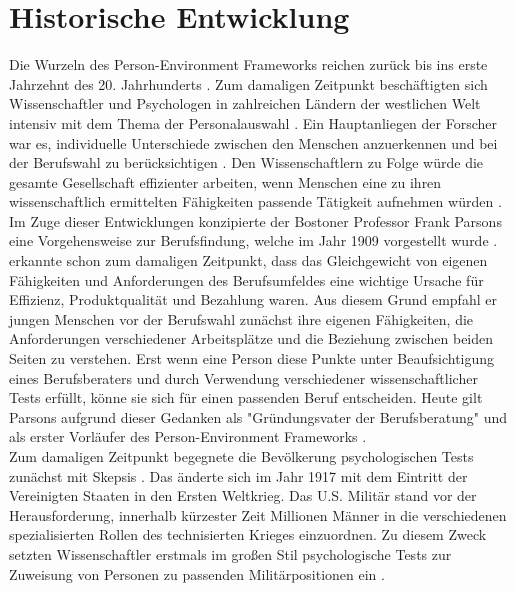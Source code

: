 \section{Historische Entwicklung}
\label{ch:personEnvironmentFit:historisches}
Die Wurzeln des Person-Environment Frameworks reichen zurück bis ins erste Jahrzehnt des 20. Jahrhunderts \cite[S. 1]{su:2015}. Zum damaligen Zeitpunkt beschäftigten sich Wissenschaftler und Psychologen in zahlreichen Ländern der westlichen Welt intensiv mit dem Thema der Personalauswahl \cite[S. 1]{salgado:2001}. Ein Hauptanliegen der Forscher war es, individuelle Unterschiede zwischen den Menschen anzuerkennen und bei der Berufswahl zu berücksichtigen \cite[S. 2ff.]{stern:1900}. Den Wissenschaftlern zu Folge würde die gesamte Gesellschaft effizienter arbeiten, wenn Menschen eine zu ihren wissenschaftlich ermittelten Fähigkeiten passende Tätigkeit aufnehmen würden \cite[S.2]{kevles:1968}\cite[S. 3]{parsons:1909}. Im Zuge dieser Entwicklungen konzipierte der Bostoner Professor Frank Parsons eine Vorgehensweise zur Berufsfindung, welche im Jahr 1909 vorgestellt wurde \cite[S. 1]{su:2015}. \textcite[S. 5ff.]{parsons:1909} erkannte schon zum damaligen Zeitpunkt, dass das Gleichgewicht von eigenen Fähigkeiten und Anforderungen des Berufsumfeldes eine wichtige Ursache für Effizienz, Produktqualität und Bezahlung waren. Aus diesem Grund empfahl er jungen Menschen vor der Berufswahl zunächst ihre eigenen Fähigkeiten, die Anforderungen verschiedener Arbeitsplätze und die Beziehung zwischen beiden Seiten zu verstehen. Erst wenn eine Person diese Punkte unter Beaufsichtigung eines Berufsberaters und durch Verwendung verschiedener wissenschaftlicher Tests erfüllt, könne sie sich für einen passenden Beruf entscheiden. Heute gilt Parsons aufgrund dieser Gedanken als "Gründungsvater der Berufsberatung" \cite[S. 3]{porfeli:2009} und als erster Vorläufer des Person-Environment Frameworks \cite[S. 2]{edwards:2008}.\\
Zum damaligen Zeitpunkt begegnete die Bevölkerung psychologischen Tests zunächst mit Skepsis \cite[S. 2]{kevles:1968}. Das änderte sich im Jahr 1917 mit dem Eintritt der Vereinigten Staaten in den Ersten Weltkrieg. Das U.S. Militär stand vor der Herausforderung, innerhalb kürzester Zeit Millionen Männer in die verschiedenen spezialisierten Rollen des technisierten Krieges einzuordnen. Zu diesem Zweck setzten Wissenschaftler erstmals im großen Stil psychologische Tests zur Zuweisung von Personen zu passenden Militärpositionen ein \cite[S. 2ff.]{kevles:1968}. \\

